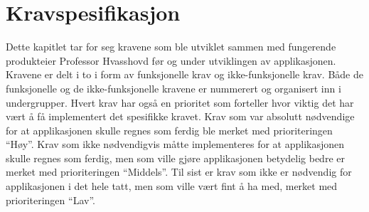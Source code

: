 \chapter{Kravspesifikasjon}
Dette kapitlet tar for seg kravene som ble utviklet sammen med fungerende produkteier Professor Hvasshovd før og under utviklingen av applikasjonen. Kravene er delt i to i form av funksjonelle krav og ikke-funksjonelle krav. Både de funksjonelle og de ikke-funksjonelle kravene er nummerert og organisert inn i undergrupper. Hvert krav har også en prioritet som forteller hvor viktig det har vært å få implementert det spesifikke kravet. Krav som var absolutt nødvendige for at applikasjonen skulle regnes som ferdig ble merket med prioriteringen \enquote{Høy}. Krav som ikke nødvendigvis måtte implementeres for at applikasjonen skulle regnes som ferdig, men som ville gjøre applikasjonen betydelig bedre er merket med prioriteringen \enquote{Middels}. Til sist er krav som ikke er nødvendig for applikasjonen i det hele tatt, men som ville vært fint å ha med, merket med prioriteringen \enquote{Lav}.

